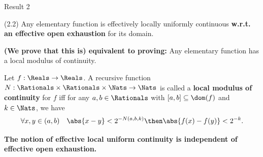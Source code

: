 \begin{frame}{Result 2}
    \pause
    \vspace{-1.5em}
    \begin{ntheorem}(2.2)
        Any elementary function is effectively locally uniformly continuous \textbf{\textcolor{BrickRed}{w.r.t.\null{} an effective open exhaustion}} for its domain.
    \end{ntheorem}
    \pause
    \vspace{-0.5em}
    \begin{exampleblock}{\color{OliveGreen}\textbf{(We prove that this is) equivalent to proving:}}
        Any elementary function has a local modulus of continuity.
    \end{exampleblock}
    \pause
    \vspace{-0.5em}
    \begin{definition}
        Let $f:\Reals\to\Reals$. A recursive function $N:\Rationals\times\Rationals\times\Nats\to\Nats$ is called a \textbf{local modulus of continuity} for $f$ iff for any $a,b\in\Rationals$ with $[a,b]\subseteq\dom(f)$ and $k\in\Nats$, we have
        \[ 
            \forall x,y \in (a,b) \quad \abs{x-y}<2^{-N(a,b,k)} \then \abs{f(x)-f(y)}<2^{-k}.
        \] 
    \end{definition}
    \pause
        {\textbf{\textcolor{OliveGreen}{The notion of effective local uniform continuity is independent
                of effective open exhaustion.}}}
\end{frame}